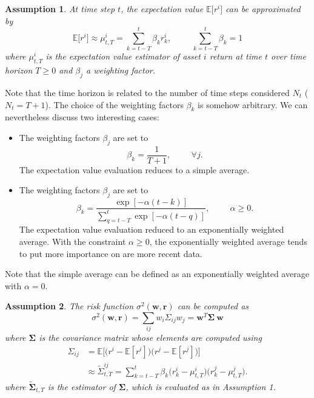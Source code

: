 \documentclass[a4paper,12pt]{report}
\newtheorem{assumption}{Assumption}
\begin{document}
\begin{assumption}
At time step $t$, the expectation value $\mathbb{E}\big[r^i\big]$ can be approximated by
$$ \mathbb{E}\big[r^i\big] \approx \mu^i_{t,T} =  \sum_{k=t-T}^{t} \beta_k  r^i_{k}, \hspace{1cm} \sum_{k=t-T}^{t} \beta_k =1 $$
where $\mu^i_{t,T}$ is the expectation value estimator of asset $i$ return at time $t$ over time horizon $T \geq 0$ and $\beta_j$ a weighting factor.
\end{assumption}
Note that the time horizon is related to the number of time steps considered $N_t$ ($N_t = T+1$). The choice of the weighting factors $\beta_k$ is somehow arbitrary. We can nevertheless discuss two interesting cases:
\begin{itemize}
\item The weighting factors $\beta_j$ are set to 
$$ \beta_k = \frac{1}{T+1}, \hspace{1cm} \forall j.$$
The expectation value evaluation reduces to a simple average.
\item The weighting factors $\beta_j$ are set to
$$ \beta_k = \frac{\exp[-\alpha (t-k)]}{\sum_{q=t-T}^{t}  \exp[-\alpha  (t-q) ]}, \hspace{1cm} \alpha \geq 0.$$
The expectation value evaluation reduced to an exponentially weighted average. With the constraint $\alpha \geq 0$, the exponentially weighted average tends to put more importance on are more recent data.
\end{itemize}
Note that the simple average can be defined as an exponentially weighted average with $\alpha=0$.\\


\begin{assumption}
The risk function $\sigma^2(\mathbf{w}, \mathbf{r})$ can be computed as
\begin{equation}
\sigma^2(\mathbf{w}, \mathbf{r}) = \sum_{ij} w_i \Sigma_{ij} w_j = \mathbf{w}^T \boldsymbol{\Sigma}~\mathbf{w}
\end{equation}
where $\boldsymbol{\Sigma}$ is the covariance matrix whose elements are computed using
\begin{equation}
\begin{split}
\Sigma_{ij} &= \mathbb{E}\Big[ \big(r^i - \mathbb{E}[r^i]\big) \big(r^j - \mathbb{E}[r^j]\big)\Big]\\
& \approx \tilde{\Sigma}^{ij}_{t,T} =  \sum_{k=t-T}^{t} \beta_k  \big( r^i_{k} - \mu^i_{t,T} \big) \big( r^j_{k} - \mu^j_{t,T} \big).
\end{split}
\end{equation}
where $\tilde{\boldsymbol{\Sigma}}_{t,T}$ is the estimator of $\boldsymbol{\Sigma}$, which is evaluated as in Assumption 1.
\end{assumption}
\end{document}
